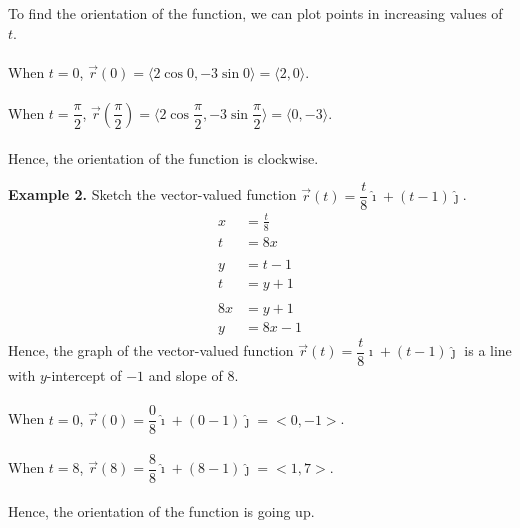 \documentclass{report}
\begin{document}
To find the orientation of the function, we can plot points in increasing
values of $t$. \\\\ \noindent When $t = 0$, $\vec{r}(0) = \langle 2\cos 0,
    -3\sin 0 \rangle = \langle 2, 0 \rangle$. \\\\ \noindent When $t =
    \dfrac{\pi}{2}$, $\vec{r}\left(\dfrac{\pi}{2}\right) = \langle 2\cos
    \dfrac{\pi}{2}, -3\sin \dfrac{\pi}{2} \rangle = \langle 0, -3 \rangle$. \\\\
\noindent Hence, the orientation of the function is clockwise. \vspace{2em}
\begin{center}
\end{center}
\newpage
\noindent\textbf{Example 2. } Sketch the vector-valued function $\vec{r}(t) = \dfrac{t}{8}\hat{\imath} + (t - 1)\hat{\jmath}$.
\begin{align*}
    x  & = \frac{t}{8} \\
    t  & = 8x          \\
    \\
    y  & = t - 1       \\
    t  & = y + 1       \\
    \\
    8x & = y + 1       \\
    y  & = 8x - 1
\end{align*}
Hence, the graph of the vector-valued function $\vec{r}(t) = \dfrac{t}{8}\hat{\imath} + (t - 1)\hat{\jmath}$ is a line with $y$-intercept of $-1$ and slope of $8$.
\\\\
When $t = 0$, $\vec{r}(0) = \dfrac{0}{8}\hat{\imath} + (0 - 1)\hat{\jmath} = <0, -1>$. \\\\ When $t = 8$, $\vec{r}(8) = \dfrac{8}{8}\hat{\imath} + (8 - 1)\hat{\jmath} = <1, 7>$. \\\\ Hence, the orientation of the function is going up.
\end{document}
